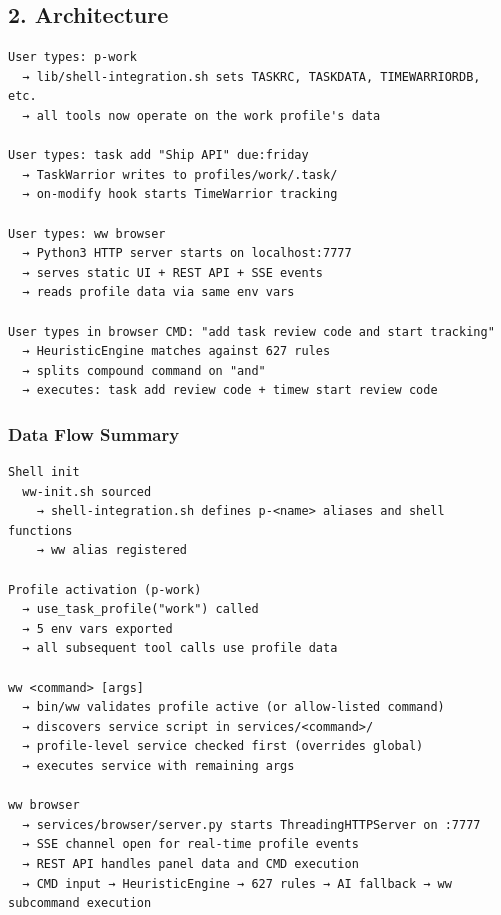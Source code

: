 \documentclass[11pt, a4paper, DIV=14]{scrartcl}
\let\origRule\rule
\renewcommand{\rule}[2]{\par\noindent{\color{BabbBorder}\origRule{#1}{#2}}\par}
\begin{document}
\subsection{2. Architecture}\label{architecture}

\begin{verbatim}
User types: p-work
  → lib/shell-integration.sh sets TASKRC, TASKDATA, TIMEWARRIORDB, etc.
  → all tools now operate on the work profile's data

User types: task add "Ship API" due:friday
  → TaskWarrior writes to profiles/work/.task/
  → on-modify hook starts TimeWarrior tracking

User types: ww browser
  → Python3 HTTP server starts on localhost:7777
  → serves static UI + REST API + SSE events
  → reads profile data via same env vars

User types in browser CMD: "add task review code and start tracking"
  → HeuristicEngine matches against 627 rules
  → splits compound command on "and"
  → executes: task add review code + timew start review code
\end{verbatim}

\subsubsection{Data Flow Summary}\label{data-flow-summary}

\begin{verbatim}
Shell init
  ww-init.sh sourced
    → shell-integration.sh defines p-<name> aliases and shell functions
    → ww alias registered

Profile activation (p-work)
  → use_task_profile("work") called
  → 5 env vars exported
  → all subsequent tool calls use profile data

ww <command> [args]
  → bin/ww validates profile active (or allow-listed command)
  → discovers service script in services/<command>/
  → profile-level service checked first (overrides global)
  → executes service with remaining args

ww browser
  → services/browser/server.py starts ThreadingHTTPServer on :7777
  → SSE channel open for real-time profile events
  → REST API handles panel data and CMD execution
  → CMD input → HeuristicEngine → 627 rules → AI fallback → ww subcommand execution
\end{verbatim}

\begin{center}\rule{0.5\linewidth}{0.5pt}\end{center}
\end{document}
